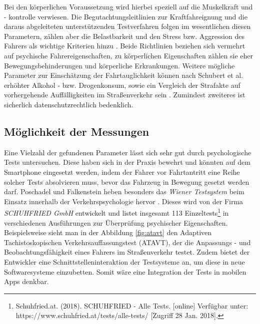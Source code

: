 Bei den körperlichen Voraussetzung wird hierbei speziell auf die Muskelkraft und - kontrolle verwiesen. Die Begutachtungsleitlinien zur Kraftfahreignung und die daraus abgeleiteten unterstützenden Testverfahren folgen im wesentlichen diesen Parametern, zählen aber die Belastbarkeit und den Stress bzw. Aggression des Fahrers als wichtige Kriterien hinzu \cite{begutachtungsrichtlinien, testverfahrenpsychometrischefahreignung}. Beide Richtlinien beziehen sich vermehrt auf psychische Fahrereigenschaften, zu körperlichen Eigenschaften zählen sie eher Bewegungsbehinderungen und körperliche Erkrankungen. Weitere mögliche Parameter zur Einschätzung der Fahrtauglichkeit können nach Schubert et al. erhöhter Alkohol - bzw. Drogenkonsum, sowie ein Vergleich der Strafakte auf vorhergehende Auffälligkeiten im Straßenverkehr sein  \cite{beurteilungskriterien}. Zumindest zweiteres ist sicherlich datenschutzrechtlich bedenklich.

\subsection{Möglichkeit der Messungen}
Eine Vielzahl der gefundenen Parameter lässt sich sehr gut durch psychologische Tests untersuchen. Diese haben sich in der Praxis bewehrt und könnten auf dem Smartphone eingesetzt werden, indem der Fahrer vor Fahrtantritt eine Reihe solcher Tests absolvieren muss, bevor das Fahrzeug in Bewegung gesetzt werden darf. Poschadel und Falkenstein heben besonders das \textit{Wiener Testsystem} beim Einsatz innerhalb der Verkehrspsychologie hervor \cite{testverfahrenpsychometrischefahreignung}. Dieses wird von der Firma \textit{SCHUHFRIED GmbH} entwickelt und listet insgesamt 113 Einzeltests\footnote{\label{foot:schuhfriedtests} Schuhfried.at. (2018). SCHUHFRIED - Alle Tests. [online] Verfügbar unter: https://www.schuhfried.at/tests/alle-tests/ [Zugriff 28 Jan. 2018].} in verschiedenen Ausführungen zur Überprüfung psychischer Eigenschaften. Beispielsweise sieht man in der Abbildung \ref{fig:atavt} den Adaptiven Tachistoskopischen Verkehrsauffassungstest (ATAVT), der die Anpassungs - und Beobachtungsfähigkeit eines Fahrers im Straßenverkehr testet. Zudem bietet der Entwickler eine Schnittstelleninteraktion der Testsysteme an, um diese in neue Softwaresysteme einzubetten. Somit wäre eine Integration der Tests in mobilen Apps denkbar.

\begingroup
	\setcounter{savefootnote}{\value{footnote}}%
	\setcounter{footnote}{2}%
	\renewcommand{\thefootnote}{\alph{footnote}}%
\endgroup

